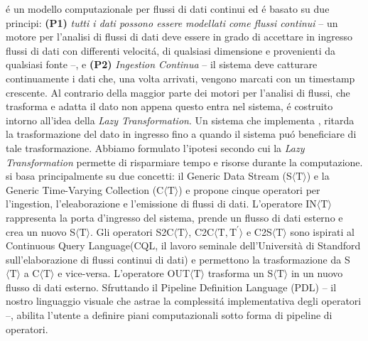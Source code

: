 \river{} \'e un modello computazionale per flussi di dati continui ed \'e basato su due principi: \textbf{(P1)} \textit{tutti i dati possono essere modellati come flussi continui} -- un motore per l'analisi di flussi di dati deve essere in grado di accettare in ingresso flussi di dati con differenti velocit\'a, di qualsiasi dimensione e provenienti da qualsiasi fonte --, e \textbf{(P2)}
\textit{Ingestion Continua} -- il sistema deve catturare continuamente i dati che, una volta arrivati, vengono marcati con un timestamp crescente.
Al contrario della maggior parte dei motori per l'analisi di flussi, che trasforma e adatta il dato non appena questo entra nel sistema, \river{} \'e costruito intorno all'idea della \textit{Lazy Transformation}.
Un sistema che implementa \river{}, ritarda la trasformazione del dato in ingresso fino a quando il sistema pu\'o beneficiare di tale trasformazione.
Abbiamo formulato l'ipotesi secondo cui la \textit{Lazy Transformation} permette di risparmiare tempo e risorse durante la computazione.
\river{} si basa principalmente su due concetti: il Generic Data Stream (S$\langle\mathrm{T}\rangle$) e la Generic Time-Varying Collection (C$\langle\mathrm{T}\rangle$) e propone cinque operatori per l'ingestion, l'eleaborazione e l'emissione di flussi di dati.
L'operatore IN$\langle\mathrm{T}\rangle$ rappresenta la porta d'ingresso del sistema, prende un flusso di dati esterno e crea un nuovo S$\langle\mathrm{T}\rangle$.
Gli operatori S2C$\langle\mathrm{T}\rangle$, C2C$\langle\mathrm{T},\mathrm{T^{\prime}}\rangle$ e C2S$\langle\mathrm{T}\rangle$ sono ispirati al Continuous Query Language(CQL, il lavoro seminale dell'Università di Standford sull'elaborazione di flussi continui di dati) e permettono la trasformazione da S$\langle\mathrm{T}\rangle$ a C$\langle\mathrm{T}\rangle$ e vice-versa.
L'operatore OUT$\langle\mathrm{T}\rangle$ trasforma un S$\langle\mathrm{T}\rangle$ in un nuovo flusso di dati esterno.
Sfruttando il Pipeline Definition Language (PDL) -- il nostro linguaggio visuale che astrae la complessit\'a implementativa degli operatori --, \river{} abilita l'utente a definire piani computazionali sotto forma di pipeline di operatori. 


